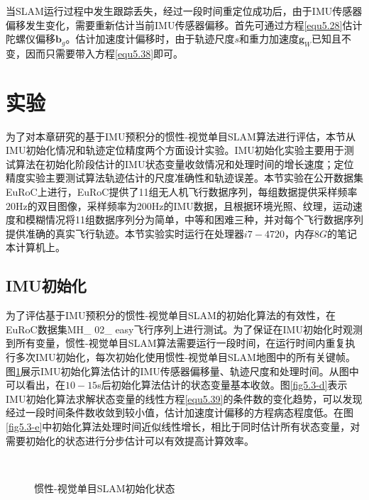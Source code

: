 当SLAM运行过程中发生跟踪丢失，经过一段时间重定位成功后，由于IMU传感器偏移发生变化，需要重新估计当前IMU传感器偏移。首先可通过方程\eqref{equ5.28}估计陀螺仪偏移$\boldsymbol{b}_g$。估计加速度计偏移时，由于轨迹尺度$s$和重力加速度$\boldsymbol{g}_W$已知且不变，因而只需要带入方程\eqref{equ5.38}即可。


\section{实验}
为了对本章研究的基于IMU预积分的惯性-视觉单目SLAM算法进行评估，本节从IMU初始化情况和轨迹定位精度两个方面设计实验。IMU初始化实验主要用于测试算法在初始化阶段估计的IMU状态变量收敛情况和处理时间的增长速度；定位精度实验主要测试算法轨迹估计的尺度准确性和轨迹误差。本节实验在公开数据集EuRoC\upcite{[5.4]}上进行，EuRoC提供了11组无人机飞行数据序列，每组数据提供采样频率$20$Hz的双目图像，采样频率为$200$Hz的IMU数据，且根据环境光照、纹理，运动速度和模糊情况将11组数据序列分为简单，中等和困难三种，并对每个飞行数据序列提供准确的真实飞行轨迹。本节实验实时运行在处理器$i7-4720$，内存$8G$的笔记本计算机上。

\subsection{IMU初始化}
为了评估基于IMU预积分的惯性-视觉单目SLAM的初始化算法的有效性，在EuRoC数据集MH\_ 02\_ easy飞行序列上进行测试。为了保证在IMU初始化时观测到所有变量，惯性-视觉单目SLAM算法需要运行一段时间，在运行时间内重复执行多次IMU初始化，每次初始化使用惯性-视觉单目SLAM地图中的所有关键帧。图\ref{fig5.3}展示IMU初始化算法估计的IMU传感器偏移量、轨迹尺度和处理时间。从图中可以看出，在$10-15$s后初始化算法估计的状态变量基本收敛。图\ref{fig5.3-d}表示IMU初始化算法求解状态变量的线性方程\eqref{equ5.39}的条件数的变化趋势，可以发现经过一段时间条件数收敛到较小值，估计加速度计偏移的方程病态程度低。在图\ref{fig5.3-e}中初始化算法处理时间近似线性增长，相比于同时估计所有状态变量\upcite{[5.5]}，对需要初始化的状态进行分步估计可以有效提高计算效率。

\begin{figure}[h]
    \centering
          \\
     \caption{惯性-视觉单目SLAM初始化状态}
\label{fig5.3}
\end{figure}        
          


